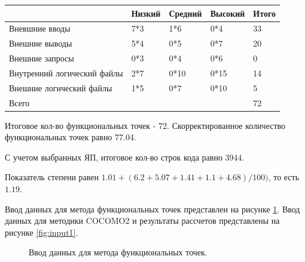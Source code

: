 \documentclass[a4paper,14pt]{article}
\begin{document}
\begin{table}[H]
\begin{tabular}{|l|l|l|l|l|}
\hline
                            & Низкий & Средний                  & Высокий                  & Итого \\ \hline
Вневшние вводы              & 7*3    & 1*6                      & 0*4                      & 33    \\ \hline
Внешние выводы              & 5*4    & 0*5                      & 0*7                      & 20    \\ \hline
Внешние запросы             & 0*3    & {0*4} & {0*6} & 0     \\ \hline
Внутренний логический файлы & 2*7    & 0*10                     & 0*15                     & 14    \\ \hline
Внешние логический файлы    & 1*5    & 0*7                      & 0*10                     & 5    \\ \hline
Всего    &     &                      &                    & 72    \\ \hline
\end{tabular}
\end{table}

Итоговое кол-во функциональных точек - 72. Скорректированное количество функциональных точек равно 77.04.

С учетом выбранных ЯП, итоговое кол-во строк кода равно 3944.

Показатель степени равен $1.01 + (6.2+5.07+1.41+1.1+4.68) / 100)$, то есть $1.19$.

Ввод данных для метода функциональных точек представлен на рисунке \ref{fig:fp_set}. Ввод данных для методики COCOMO2 и результаты рассчетов представлены на рисунке \ref{fig:input1}. 

\newpage
\begin{figure}[!h]
         \caption{Ввод данных для метода функциональных точек.}
    \label{fig:fp_set}
\end{figure}
\end{document}
